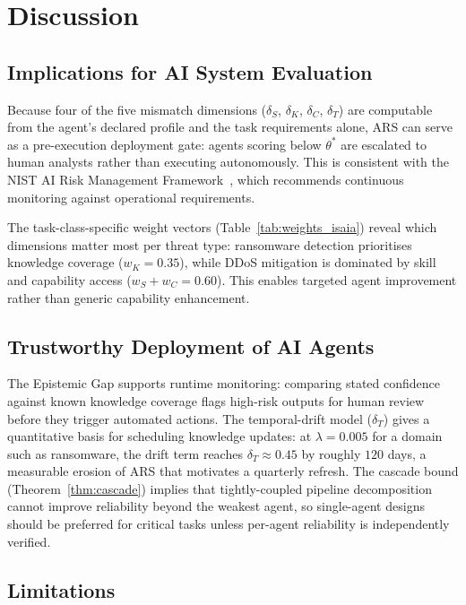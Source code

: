 \section{Discussion}
\label{sec:discussion}

\subsection{Implications for AI System Evaluation}

Because four of the five mismatch dimensions ($\delta_S$, $\delta_K$,
$\delta_C$, $\delta_T$) are computable from the agent's declared profile
and the task requirements alone, ARS can serve as a pre-execution
deployment gate: agents scoring below $\theta^*$ are escalated to human
analysts rather than executing autonomously. This is consistent with the
NIST AI Risk Management Framework~\cite{nist_ai_rmf}, which recommends
continuous monitoring against operational requirements.

The task-class-specific weight vectors (Table~\ref{tab:weights_isaia})
reveal which dimensions matter most per threat type: ransomware detection
prioritises knowledge coverage ($w_K = 0.35$), while DDoS mitigation is
dominated by skill and capability access ($w_S + w_C = 0.60$). This
enables targeted agent improvement rather than generic capability
enhancement.

\subsection{Trustworthy Deployment of AI Agents}

The Epistemic Gap supports runtime monitoring: comparing stated confidence
against known knowledge coverage flags high-risk outputs for human review
before they trigger automated actions. The temporal-drift model
($\delta_T$) gives a quantitative basis for scheduling knowledge
updates: at $\lambda = 0.005$ for a domain such as ransomware, the drift
term reaches $\delta_T \approx 0.45$ by roughly $120$ days, a measurable
erosion of ARS that motivates a quarterly refresh. The cascade bound (Theorem~\ref{thm:cascade}) implies that
tightly-coupled pipeline decomposition cannot improve reliability beyond
the weakest agent, so single-agent designs should be preferred for critical
tasks unless per-agent reliability is independently verified.

\subsection{Limitations}

